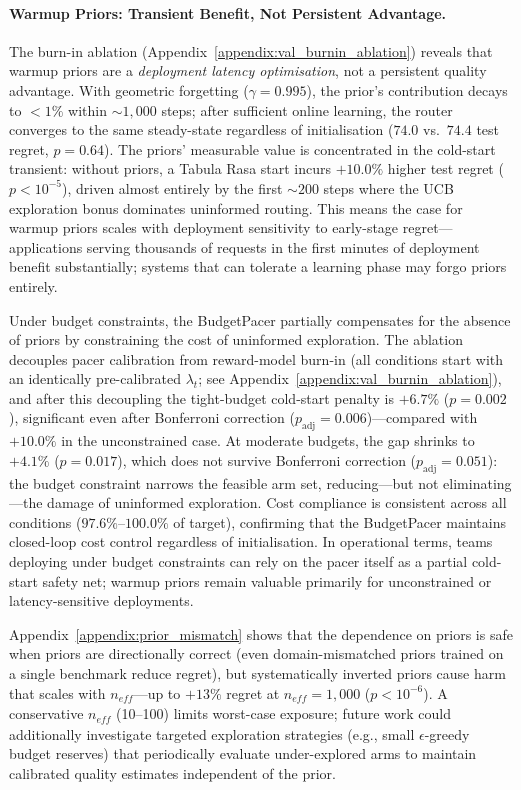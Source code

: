 \paragraph{Warmup Priors: Transient Benefit, Not Persistent Advantage.}
The burn-in ablation (Appendix~\ref{appendix:val_burnin_ablation}) reveals that warmup priors are a \emph{deployment latency optimisation}, not a persistent quality advantage.
With geometric forgetting ($\gamma{=}0.995$), the prior's contribution decays to $<1\%$ within ${\sim}1{,}000$ steps; after sufficient online learning, the router converges to the same steady-state regardless of initialisation ($74.0$ vs.\ $74.4$ test regret, $p{=}0.64$).
The priors' measurable value is concentrated in the cold-start transient: without priors, a Tabula Rasa start incurs $+10.0\%$ higher test regret ($p < 10^{-5}$), driven almost entirely by the first ${\sim}200$ steps where the UCB exploration bonus dominates uninformed routing.
This means the case for warmup priors scales with deployment sensitivity to early-stage regret---applications serving thousands of requests in the first minutes of deployment benefit substantially; systems that can tolerate a learning phase may forgo priors entirely.

Under budget constraints, the BudgetPacer partially compensates for the absence of priors by constraining the cost of uninformed exploration.
The ablation decouples pacer calibration from reward-model burn-in (all conditions start with an identically pre-calibrated $\lambda_t$; see Appendix~\ref{appendix:val_burnin_ablation}), and after this decoupling the tight-budget cold-start penalty is $+6.7\%$ ($p{=}0.002$), significant even after Bonferroni correction ($p_{\mathrm{adj}}{=}0.006$)---compared with $+10.0\%$ in the unconstrained case.
At moderate budgets, the gap shrinks to $+4.1\%$ ($p{=}0.017$), which does not survive Bonferroni correction ($p_{\mathrm{adj}}{=}0.051$): the budget constraint narrows the feasible arm set, reducing---but not eliminating---the damage of uninformed exploration.
Cost compliance is consistent across all conditions ($97.6\%$--$100.0\%$ of target), confirming that the BudgetPacer maintains closed-loop cost control regardless of initialisation.
In operational terms, teams deploying under budget constraints can rely on the pacer itself as a partial cold-start safety net; warmup priors remain valuable primarily for unconstrained or latency-sensitive deployments.

Appendix~\ref{appendix:prior_mismatch} shows that the dependence on priors is safe when priors are directionally correct (even domain-mismatched priors trained on a single benchmark reduce regret), but systematically inverted priors cause harm that scales with $n_\mathit{eff}$---up to $+13\%$ regret at $n_\mathit{eff}{=}1{,}000$ ($p < 10^{-6}$).
A conservative $n_\mathit{eff}$ (10--100) limits worst-case exposure; future work could additionally investigate targeted exploration strategies (e.g., small $\epsilon$-greedy budget reserves) that periodically evaluate under-explored arms to maintain calibrated quality estimates independent of the prior.

